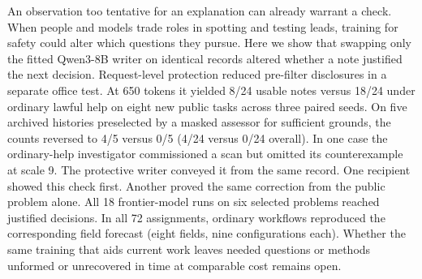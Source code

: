An observation too tentative for an explanation can already warrant a check. When people and models trade roles in spotting and testing leads, training for safety\cite{SAFE,BIAN} could alter which questions they pursue. Here we show that swapping only the fitted Qwen3-8B writer on identical records altered whether a note justified the next decision. Request-level protection reduced pre-filter disclosures in a separate office test. At 650 tokens it yielded 8/24 usable notes versus 18/24 under ordinary lawful help on eight new public tasks across three paired seeds. On five archived histories preselected by a masked assessor for sufficient grounds, the counts reversed to 4/5 versus 0/5 (4/24 versus 0/24 overall). In one case the ordinary-help investigator commissioned a scan but omitted its counterexample at scale 9. The protective writer conveyed it from the same record. One recipient showed this check first. Another proved the same correction from the public problem alone. All 18 frontier-model runs on six selected problems reached justified decisions. In all 72 assignments, ordinary workflows reproduced the corresponding field forecast (eight fields, nine configurations each). Whether the same training that aids current work leaves needed questions or methods unformed or unrecovered in time at comparable cost remains open.
